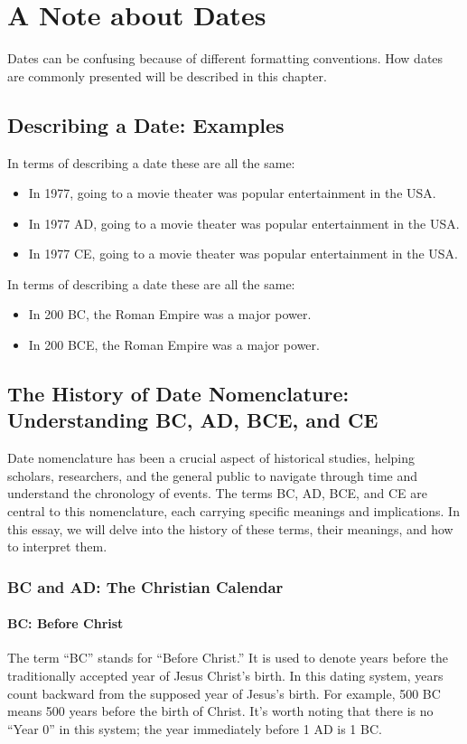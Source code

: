 \documentclass[a4paper,12pt]{book}
\begin{document}
\section*{A Note about Dates}
Dates can be confusing because of different formatting conventions. How dates are commonly presented will be described in this chapter.

\subsection*{Describing a Date: Examples}
In terms of describing a date these are all the same:

\begin{itemize}
    \item In 1977, going to a movie theater was popular entertainment in the USA.
    \item In 1977 AD, going to a movie theater was popular entertainment in the USA.
    \item In 1977 CE, going to a movie theater was popular entertainment in the USA.
\end{itemize}

In terms of describing a date these are all the same:

\begin{itemize}
    \item In 200 BC, the Roman Empire was a major power.
    \item In 200 BCE, the Roman Empire was a major power.
\end{itemize}

\subsection*{The History of Date Nomenclature: Understanding BC, AD, BCE, and CE}
Date nomenclature has been a crucial aspect of historical studies, helping scholars, researchers, and the general public to navigate through time and understand the chronology of events. The terms BC, AD, BCE, and CE are central to this nomenclature, each carrying specific meanings and implications. In this essay, we will delve into the history of these terms, their meanings, and how to interpret them.

\subsubsection*{BC and AD: The Christian Calendar}
\paragraph{BC: Before Christ}
The term ``BC'' stands for ``Before Christ.'' It is used to denote years before the traditionally accepted year of Jesus Christ’s birth. In this dating system, years count backward from the supposed year of Jesus’s birth. For example, 500 BC means 500 years before the birth of Christ. It’s worth noting that there is no ``Year 0'' in this system; the year immediately before 1 AD is 1 BC.
\end{document}

